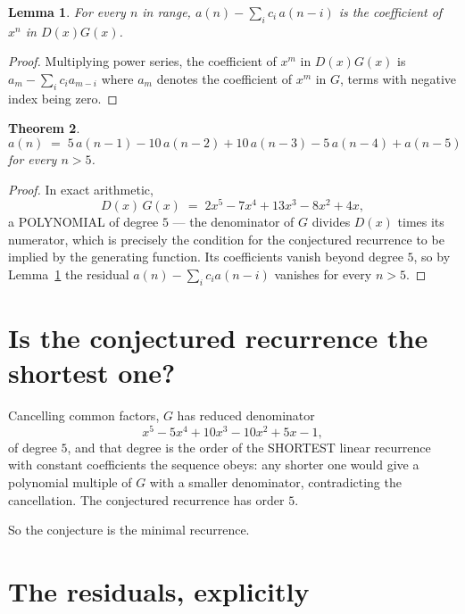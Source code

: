 \documentclass[11pt,a4paper]{article}
\theoremstyle{plain}
\newtheorem{theorem}{Theorem}
\newtheorem{lemma}[theorem]{Lemma}
\theoremstyle{definition}
\begin{document}
\begin{lemma}\label{lem:key}
For every $n$ in range, $a(n)-\sum_i c_i\,a(n-i)$ is the coefficient of $x^{n}$ in
$D(x)G(x)$.
\end{lemma}

\begin{proof}
Multiplying power series, the coefficient of $x^{m}$ in $D(x)G(x)$ is
$a_m-\sum_i c_i a_{m-i}$ where $a_m$ denotes the coefficient of $x^{m}$ in $G$, terms with
negative index being zero.
\end{proof}

\begin{theorem}
\[
a(n)\;=\;5\,a(n-1) - 10\,a(n-2) + 10\,a(n-3) - 5\,a(n-4) + a(n-5)
\]
for every $n>5$.
\end{theorem}

\begin{proof}
In exact arithmetic,
\[
D(x)\,G(x)\;=\;2 x^{5} - 7 x^{4} + 13 x^{3} - 8 x^{2} + 4 x,
\]
a POLYNOMIAL of degree $5$ --- the denominator of $G$ divides $D(x)$ times its numerator,
which is precisely the condition for the conjectured recurrence to be implied by the
generating function. Its coefficients vanish beyond degree $5$, so by
Lemma~\ref{lem:key} the residual $a(n)-\sum_ic_ia(n-i)$ vanishes for every
$n>5$.
\end{proof}

\section{Is the conjectured recurrence the shortest one?}

Cancelling common factors, $G$ has reduced denominator
\[
x^{5} - 5 x^{4} + 10 x^{3} - 10 x^{2} + 5 x - 1,
\]
of degree $5$, and that degree is the order of the SHORTEST linear recurrence with
constant coefficients the sequence obeys: any shorter one would give a polynomial multiple of
$G$ with a smaller denominator, contradicting the cancellation. The conjectured recurrence has
order $5$.

So the conjecture is the minimal recurrence.

\section{The residuals, explicitly}
\end{document}
